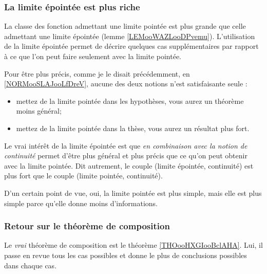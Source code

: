 \subsubsection{La limite épointée est plus riche}

La classe des fonction admettant une limite pointée est plus grande que celle admettant une limite épointée (lemme \ref{LEMooWAZLooDPvemu}). L'utilisation de la limite épointée permet de décrire quelques cas supplémentaires par rapport à ce que l'on peut faire seulement avec la limite pointée.

Pour être plus précis, comme je le disait précédemment, en \ref{NORMooSLAJooLfDreV}, aucune des deux notions n'est satisfaisante seule :
\begin{itemize}
    \item mettez de la limite pointée dans les hypothèses, vous aurez un théorème moins général;
    \item mettez de la limite pointée dans la thèse, vous aurez un résultat plus fort.
\end{itemize}

Le vrai intérêt de la limite épointée est que \emph{en combinaison avec la notion de continuité} permet d'être plus général et plus précis que ce qu'on peut obtenir avec la limite pointée. Dit autrement, le couple (limite épointée, continuité) est plus fort que le couple (limite pointée, continuité).

D'un certain point de vue, oui, la limite pointée est plus simple, mais elle est plus simple parce qu'elle donne moins d'informations.

\subsubsection{Retour sur le théorème de composition}

Le \emph{vrai} théorème de composition est le théorème \ref{THOooHXGIooBclAHA}. Lui, il passe en revue tous les cas possibles et donne le plus de conclusions possibles dans chaque cas.

